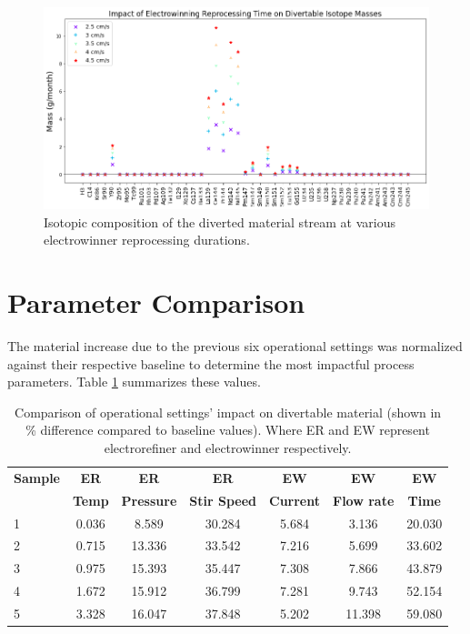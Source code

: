 \begin{figure}
	\includegraphics[width=\linewidth]{images/time-sa-diff}
	\caption{Isotopic composition of the diverted material stream at various electrowinner reprocessing durations.}
	\label{fig:win-time-diff}
\end{figure}

\FloatBarrier

\section{Parameter Comparison}

The material increase due to the previous six operational settings was normalized against their respective baseline
to determine the most impactful process parameters. Table \ref{tab:compare} summarizes these values.

\begin{table}[h!]
	\centering
	\begin{tabularx}{0.9\linewidth}{lcccccc}
		\hline
		\textbf{Sample} & \textbf{ER} & \textbf{ER} & \textbf{ER} & \textbf{EW}
		& \textbf{EW} & \textbf{EW} \\
		& \textbf{Temp} & \textbf{Pressure} & \textbf{Stir Speed} & \textbf{Current} & \textbf{Flow rate} & \textbf{Time} \\
		\hline \hline
		1 & 0.036 & 8.589 & 30.284 & 5.684 & 3.136 & 20.030 \\ \hline
		2 & 0.715 & 13.336 & 33.542 & 7.216 & 5.699 & 33.602 \\ \hline
		3 & 0.975 & 15.393 & 35.447 & 7.308 & 7.866 & 43.879 \\ \hline
		4 & 1.672 & 15.912 & 36.799 & 7.281 & 9.743 & 52.154 \\ \hline
		5 & 3.328 & 16.047 & 37.848 & 5.202 & 11.398 & 59.080 \\ \hline
	\end{tabularx}
	\caption {Comparison of operational settings' impact on divertable material (shown in
		\% difference compared to baseline values). Where ER and EW represent electrorefiner and electrowinner respectively.}
	\label {tab:compare}
\end{table}

